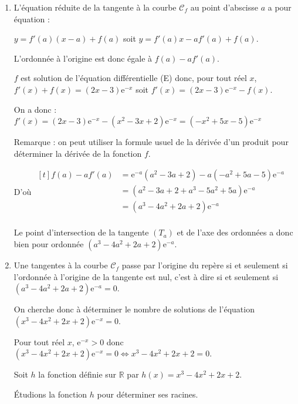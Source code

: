 \documentclass[10pt]{article}
\providecommand{\R}{\mathbb{R}}
\providecommand{\e}{{\mathrm{e}}}
\begin{document}
	\begin{enumerate}
		\item  L'équation réduite de la tangente à la courbe $\mathcal{C}_{f}$ au point d'abscisse $a$ a pour équation :

		$y=f'(a) (x-a) +f(a) $ soit $y= f'(a) x -af'(a) +f(a)$.

		L'ordonnée à l'origine est donc égale à $f(a) -af'(a)$.


		$f$ est solution de l'équation différentielle (E)  donc, pour tout réel $x$, $f'(x) +f(x) = (2x-3) \e^{-x}$
		soit $f'(x)=  (2x-3) \e^{-x} -f(x)$.

		On a donc : $f'(x) = (2x-3) \e^{-x} - \left( x^2-3x+2\right) \e ^{-x} = \left( -x^2+5x-5\right) \e ^{-x}$

		Remarque : on peut utiliser la formule usuel de la dérivée d'un produit pour déterminer la dérivée de la fonction $f$.

		D'où $\begin{aligned}[t] f(a) - af' (a) &= \e^{-a} \left( a^2 -3a+2\right) -a \left( -a^2+5a-5\right) \e ^{-a}\\
			&= \left( a^2 -3a +2 +a^3 -5a^2+5a\right) \e ^{-a}\\
			&= \left(  a^3-4  a^2 +2a +2\right) \e ^{-a}\\
		\end{aligned}$



		Le point d'intersection de la tangente $(T_{a})$ et de l'axe des ordonnées a donc bien  pour ordonnée $\left(a^{3}-4 a^{2}+2 a+2\right) \e^{-a}$.

		\item Une tangentes à la courbe $\mathcal{C}_{f}$ passe par l'origine du repère si et seulement si  l'ordonnée à l'origine de la tangente est nul, c'est à dire si et seulement si $\left(a^{3}-4 a^{2}+2 a+2\right) \e^{-a}=0$.

		On cherche donc à déterminer le nombre de solutions de l'équation $\left(x^{3}-4 x^{2}+2 x+2\right) \e^{-x}=0$.

		Pour tout réel $x$, $\e ^{-x} >0$ donc  $\left(x^{3}-4 x^{2}+2 x+2\right) \e^{-x}=0 \iff x^{3}-4 x^{2}+2 x+2=0$.

		\bigskip

		Soit $h$ la fonction définie sur $\R$ par $h(x) = x^{3}-4 x^{2}+2 x+2$.

		Étudions la fonction $h$  pour déterminer ses racines.

		\bigskip


\end{enumerate}
\end{document}
